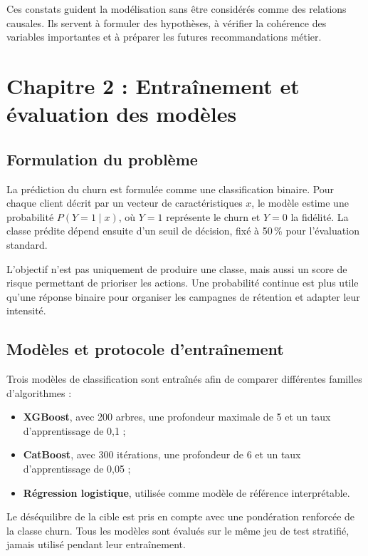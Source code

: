 \documentclass[12pt, a4paper]{article}
\begin{document}
Ces constats guident la modélisation sans être considérés comme des relations
causales. Ils servent à formuler des hypothèses, à vérifier la cohérence des
variables importantes et à préparer les futures recommandations métier.

\section{Chapitre 2 : Entraînement et évaluation des modèles}

\subsection{Formulation du problème}

La prédiction du churn est formulée comme une classification binaire. Pour
chaque client décrit par un vecteur de caractéristiques $x$, le modèle estime
une probabilité $P(Y=1 \mid x)$, où $Y=1$ représente le churn et $Y=0$ la
fidélité. La classe prédite dépend ensuite d'un seuil de décision, fixé à
50\,\% pour l'évaluation standard.

L'objectif n'est pas uniquement de produire une classe, mais aussi un score de
risque permettant de prioriser les actions. Une probabilité continue est plus
utile qu'une réponse binaire pour organiser les campagnes de rétention et
adapter leur intensité.

\subsection{Modèles et protocole d'entraînement}

Trois modèles de classification sont entraînés afin de comparer différentes
familles d'algorithmes :
\begin{itemize}[leftmargin=*]
    \item \textbf{XGBoost}, avec 200 arbres, une profondeur maximale de 5 et un
    taux d'apprentissage de 0,1 ;
    \item \textbf{CatBoost}, avec 300 itérations, une profondeur de 6 et un taux
    d'apprentissage de 0,05 ;
    \item \textbf{Régression logistique}, utilisée comme modèle de référence
    interprétable.
\end{itemize}

Le déséquilibre de la cible est pris en compte avec une pondération renforcée
de la classe churn. Tous les modèles sont évalués sur le même jeu de test
stratifié, jamais utilisé pendant leur entraînement.
\end{document}
